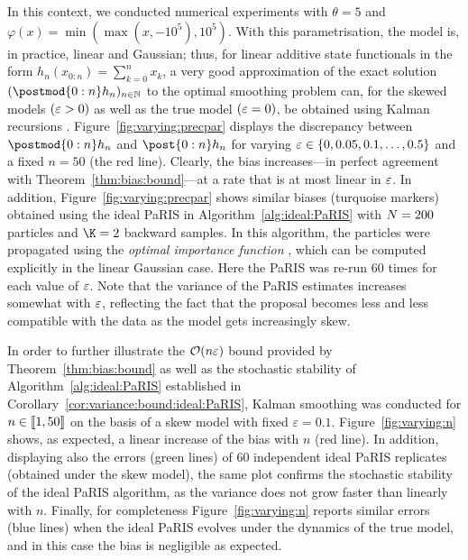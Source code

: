 In this context, we conducted numerical experiments with $\theta = 5$ and $\varphi(x) = \min(\max(x, -10^5), 10^5)$. With this parametrisation, the model is, in practice, linear and Gaussian; thus, for linear additive state functionals in the form $h_n(x_{0:n}) = \sum_{k = 0}^n x_k$, a very good approximation of the exact solution $(\postmod{0:n} h_n)_{n \in \nset}$ to the optimal smoothing problem can, for the skewed models $(\varepsilon > 0)$ as well as the true model $(\varepsilon = 0)$, be obtained using Kalman recursions \cite{rauch1965maximum}. Figure~\ref{fig:varying:precpar} displays the discrepancy between $\postmod{0:n} h_n$ and $\post{0:n} h_n$ for varying $\varepsilon \in \{0, 0.05, 0.1, \ldots, 0.5 \}$ and a fixed $n = 50$ (the red line). Clearly, the bias increases---in perfect agreement with Theorem~\ref{thm:bias:bound}---at a rate that is at most linear in $\varepsilon$. In addition, Figure~\ref{fig:varying:precpar} shows similar biases (turquoise markers) obtained using the ideal PaRIS in Algorithm~\ref{alg:ideal:PaRIS} with $N = 200$ particles and $\K = 2$ backward samples. In this algorithm, the particles were propagated using the \textit{optimal importance function} \cite{doucet2000sequential}, which can be computed explicitly in the linear Gaussian case. Here the PaRIS was re-run $60$ times for each value of $\varepsilon$. Note that the variance of the PaRIS estimates increases somewhat with $\varepsilon$, reflecting the fact that the proposal becomes less and less compatible with the data as the model gets increasingly skew. 

In order to further illustrate the $\mathcal{O}(n \varepsilon)$ bound provided by Theorem~\ref{thm:bias:bound} as well as the stochastic stability of Algorithm~\ref{alg:ideal:PaRIS} established in Corollary~\ref{cor:variance:bound:ideal:PaRIS}, Kalman smoothing was conducted for $n \in \llbracket 1, 50 \rrbracket$ on the basis of a skew model with fixed $\varepsilon = 0.1$. Figure~\ref{fig:varying:n} shows, as expected, a linear increase of the bias with $n$ (red line). In addition, displaying also the errors (green lines) of $60$ independent ideal PaRIS replicates (obtained under the skew model), the same plot confirms the stochastic stability of the ideal PaRIS algorithm, as the variance does not grow faster than linearly with $n$. Finally, for completeness Figure~\ref{fig:varying:n} reports similar errors (blue lines) when the ideal PaRIS evolves under the dynamics of the true model, and in this case the bias is negligible as expected.%

